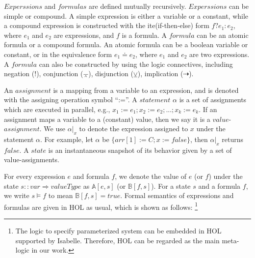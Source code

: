 \documentclass[final]{IEEEtran}
\def \eqc {\doteq }
\def \andc {\barwedge }
\def \negc {!}
\def \orc {\veebar }
\begin{document}

$Experssions$ and $formulas$ are defined mutually recursively. $Experssions$ can be simple or compound. A simple expression is either a variable or a constant, while a compound expression is constructed with the ite(if-then-else) form $f?e_1:e_2$, where $e_1$ and $e_2$ are expressions, and $f$ is a formula.
A $formula$ can be an atomic formula or a compound formula. An atomic formula can be a boolean variable or  constant, or in the equivalence form $e_1\eqc e_2$, where $e_1$ and $e_2$ are two expressions. A $formula$ can also be constructed by using the logic connectives, including negation ($\negc$), conjunction ($\andc$), disjunction ($\orc$), implication ($\dashrightarrow$). %

An $assignment$ is a mapping from a variable to an expression, and is denoted with the assigning operation symbol ``:=''. A $statement$ $\alpha$ is a set of assignments which are executed in parallel, e.g., $ x_1:=e_1;x_2:=e_2;...;x_k:=e_k $. If an assignment maps a variable to a (constant) value, then we say it is a $value$-$assignment$.  We use $\alpha|_x$ to denote the expression assigned to $x$ under the statement $\alpha$. For example, let $\alpha$ be $\{arr[1]:=C;x:=false\}$, then $\alpha|_x$ returns $false$. A $state$ is an instantaneous snapshot of its behavior given by a set of value-assignments.




For every expression $e$ and formula $f$, we denote the value of $e$ (or $f$) under the state $s::var \Rightarrow valueType $ as $\mathbb{A}[e,s]$ (or $\mathbb{B}[f,s]$).
For a state $s$ and a formula $f$, we write
$s\models f$ to mean %
$\mathbb{B}[f,s]=true$.
Formal semantics of expressions and formulas are given in HOL  as usual, which is shown as follows: \footnote{The logic to specify parameterized system  can be embedded in HOL supported by Isabelle. Therefore, HOL can be regarded as the main meta-logic in our work.}\\
\end{document}
